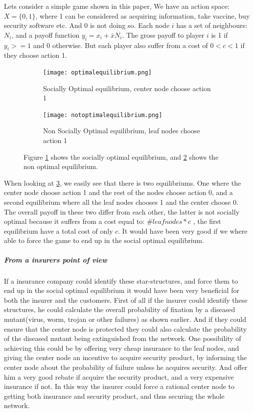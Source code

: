 Lets consider a simple game shown in this paper,
We have an action space: $X=\{0,1\}$, where 1 can be considered as acquiring information, take vaccine, buy security software etc. And 0 is not doing so.
Each node $i$ has a set of neighbours: $N_{i} $, and a payoff function $y_{i}=x_{i}+\bar{x}N_{i}$. 
The gross payoff to player $i$ is 1 if $y_{i}>=1$ and 0 otherwise. But each player also suffer from a cost of $0<c<1$ if they choose action 1.
\begin{figure}[h]
\centering
\begin{subfigure}{.4\textwidth}
  \centering
  \texttt{[image: optimalequilibrium.png]}
  \caption{\label{fig:optequi} Socially Optimal equilibrium, center node choose action 1}
\end{subfigure}
\quad
\begin{subfigure}{.4\textwidth}
  \centering
  \texttt{[image: notoptimalequilibrium.png]}
  \caption{\label{fig:notoptequi} Non Socially Optimal equilibrium, leaf nodes choose action 1}
\end{subfigure}
\caption{\label{fig:starequi} Figure \ref{fig:optequi} shows the socially optimal equilibrium, and \ref{fig:notoptequi} shows the non optimal equilibrium.}

\end{figure}
When looking at \ref{fig:starequi}, we easily see that there is two equilibriums. One where the center node choose action 1 and the rest of the nodes choose action 0, and a second equilibrium where all the leaf nodes chooses 1 and the center choose 0.
The overall payoff in these two differ from each other, the latter is not socially optimal because it
 suffers from a cost equal to: $\#leaf nodes*c$ , the first equilibrium have a total cost of only $c$.
 It would have been very good if we where able to force the game to end up in the social optimal equilibrium.
\subparagraph{From a insurers point of view}
If a insurance company could identify these star-structures, and force them to end up in the social optimal equilibrium it would have been very beneficial for both the insurer and the customers.
First of all if the insurer could identify these structures, he could calculate the overall probability of fixation by a diseased mutant(virus, worm, trojan or other failures) as shown earlier. And if they could ensure that the center node is protected they could also calculate the probability of the diseased mutant being extinguished from the network.
One possibility of achieving this could be by offering very cheap insurance to the leaf nodes, and giving the center node an incentive to acquire security product, by informing the center node about the probability of failure unless he acquires security. And offer him a very good rebate if acquire the security product, and a very expensive insurance if not. In this way the insurer could force a rational center node to getting both insurance and security product, and thus securing the whole network.

